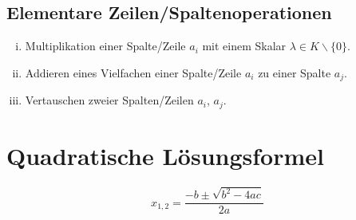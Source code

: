 \subsection{Elementare Zeilen/Spaltenoperationen}\label{sec:elem_op}
\begin{enumerate}[i)]
    \item Multiplikation einer Spalte/Zeile $a_i$ mit einem Skalar $\lambda\in K\backslash\{0\}$.
    \item Addieren eines Vielfachen einer Spalte/Zeile $a_i$ zu einer Spalte $a_j$.
    \item Vertauschen zweier Spalten/Zeilen $a_i$, $a_j$.\label{itm:elem_op_vertauschen}
\end{enumerate}
\section{Quadratische Lösungsformel}
\label{sec:quadratische_formel}
\[x_{1,2}=\frac{-b\pm\sqrt{b^2-4ac}}{2a}\]

